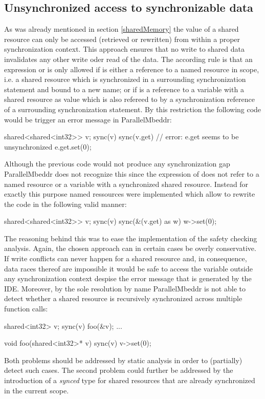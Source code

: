 \subsection{Unsynchronized access to synchronizable data}
As was already mentioned in section \ref*{sharedMemory} the value of a shared resource can only be accessed (retrieved or rewritten) from within a proper synchronization context. This approach ensures that no write to shared data invalidates any other write oder read of the data. The according rule is that an expression  or  is only allowed if  is either a reference to a named resource in scope, i.e. a shared resource which is synchronized in a surrounding synchronization statement and bound to a new name; or if  is a reference to a variable with a shared resource as value which is also refereed to by a synchronization reference of a surrounding synchronization statement. By this restriction the following code would be trigger an error message in ParallelMbeddr:
\begin{ccode}
shared<shared<int32>> v;
sync(v) {
  sync(v.get) {
    // error: e.get seems to be unsynchronized
    e.get.set(0);
  }
}
\end{ccode}
Although the previous code would not produce any synchronization gap ParallelMbeddr does not recognize this since the expression  of  does not refer to a named resource or a variable with a synchronized shared resource. Instead for exactly this purpose named ressources were implemented which allow to rewrite the code in the following valid manner:
\begin{ccode}
shared<shared<int32>> v;
sync(v) {
  sync(&(v.get) as w) {
    w->set(0);
  }
}
\end{ccode}
The reasoning behind this was to ease the implementation of the safety checking analysis. Again, the chosen approach can in certain cases be overly conservative. If write conflicts can never happen for a shared resource and, in consequence, data races thereof are impossible it would be safe to access the variable outside any synchronization context despise the error message that is generated by the IDE. Moreover, by the sole resolution by name ParallelMbeddr is not able to detect whether a shared resource is recursively synchronized across multiple function calls:
\begin{ccode}
  shared<int32> v;
  sync(v) { foo(&v); }
  ...

void foo(shared<int32>* v) {
  sync(v) { v->set(0); }
}
\end{ccode}
Both problems should be addressed by static analysis in order to (partially) detect such cases. The second problem could further be addressed by the introduction of a \textit{synced} type for shared resources that are already synchronized in the current scope.

